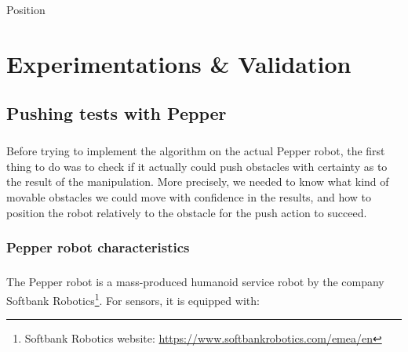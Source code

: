 Position%

\chapter{Experimentations \& Validation} %

\label{Chapter5} %

\section{Pushing tests with Pepper}

\paragraph{} Before trying to implement the algorithm on the actual Pepper robot, the first thing to do was to check if it actually could push obstacles with certainty as to the result of the manipulation. More precisely, we needed to know what kind of movable obstacles we could move with confidence in the results, and how to position the robot relatively to the obstacle for the push action to succeed.

\subsection{Pepper robot characteristics}

\paragraph{} The Pepper robot is a mass-produced humanoid service robot by the company Softbank Robotics\footnote{Softbank Robotics website: \url{https://www.softbankrobotics.com/emea/en}}. For sensors, it is equipped with:

